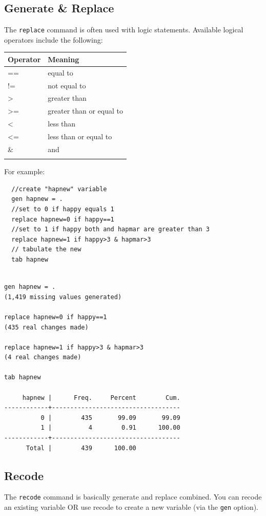 \documentclass[]{book}
\begin{document}
\hypertarget{generate-replace}{%
\subsection{Generate \& Replace}\label{generate-replace}}

The \texttt{replace} command is often used with logic statements. Available logical operators include the following:

\begin{longtable}[]{@{}ll@{}}
\toprule
Operator & Meaning\tabularnewline
\midrule
\endhead
== & equal to\tabularnewline
!= & not equal to\tabularnewline
\textgreater{} & greater than\tabularnewline
\textgreater{}= & greater than or equal to\tabularnewline
\textless{} & less than\tabularnewline
\textless{}= & less than or equal to\tabularnewline
\& & and\tabularnewline
&\tabularnewline
\bottomrule
\end{longtable}

For example:

\begin{verbatim}
  //create "hapnew" variable
  gen hapnew = .
  //set to 0 if happy equals 1
  replace hapnew=0 if happy==1 
  //set to 1 if happy both and hapmar are greater than 3
  replace hapnew=1 if happy>3 & hapmar>3 
  // tabulate the new 
  tab hapnew
\end{verbatim}

\begin{verbatim}

gen hapnew = .
(1,419 missing values generated)

replace hapnew=0 if happy==1 
(435 real changes made)

replace hapnew=1 if happy>3 & hapmar>3 
(4 real changes made)

tab hapnew

     hapnew |      Freq.     Percent        Cum.
------------+-----------------------------------
          0 |        435       99.09       99.09
          1 |          4        0.91      100.00
------------+-----------------------------------
      Total |        439      100.00
\end{verbatim}

\hypertarget{recode}{%
\subsection{Recode}\label{recode}}

The \texttt{recode} command is basically generate and replace combined. You can recode an existing variable OR use recode to create a new variable (via the \texttt{gen} option).
\end{document}
